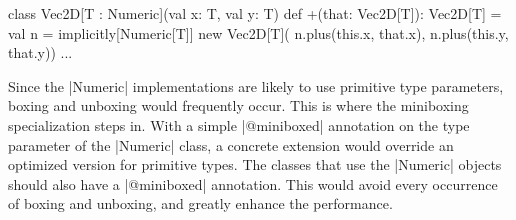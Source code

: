 \begin{lstlisting-nobreak}
 class Vec2D[T : Numeric](val x: T, val y: T) {
   def +(that: Vec2D[T]): Vec2D[T] = {
     val n = implicitly[Numeric[T]]
     new Vec2D[T](
       n.plus(this.x, that.x),
       n.plus(this.y, that.y))
   }
   ...
 }
\end{lstlisting-nobreak}

Since the |Numeric| implementations are likely to use primitive type parameters, boxing and unboxing would frequently occur. This is where the miniboxing specialization steps in. With a simple |@miniboxed| annotation on the type parameter of the |Numeric| class, a concrete extension would override an optimized version for primitive types. The classes that use the |Numeric| objects should also have a |@miniboxed| annotation. This would avoid every occurrence of boxing and unboxing, and greatly enhance the performance.